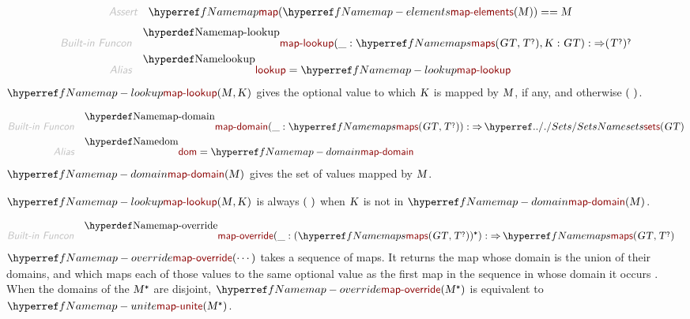 \begin{align*}
  \KEY{Assert} \quad
  & \NAMEREF{map}
      (  \NAMEREF{map-elements}
              (  \VAR{M} ) ) 
    == \VAR{M}
\end{align*}
\begin{align*}
  \KEY{Built-in Funcon} \quad
  & \NAMEDECL{map-lookup}(
                       \_ : \NAMEREF{maps}
                                 (  \VAR{GT}, 
                                        \VAR{T}\QUERY ), \VAR{K} : \VAR{GT}) 
    :  \TO (  \VAR{T}\QUERY )\QUERY 
\\
  \KEY{Alias} \quad
  & \NAMEDECL{lookup} = \NAMEREF{map-lookup}
\end{align*}
$\SHADE{\NAMEREF{map-lookup}
           (  \VAR{M}, 
                  \VAR{K} )}$ gives the optional value to which $\SHADE{\VAR{K}}$ is mapped by $\SHADE{\VAR{M}}$,
  if any, and otherwise $\strut(   \  )\strut$.

\begin{align*}
  \KEY{Built-in Funcon} \quad
  & \NAMEDECL{map-domain}(
                       \_ : \NAMEREF{maps}
                                 (  \VAR{GT}, 
                                        \VAR{T}\QUERY )) 
    :  \TO \NAMEHYPER{../.}{Sets}{sets}
                     (  \VAR{GT} ) 
\\
  \KEY{Alias} \quad
  & \NAMEDECL{dom} = \NAMEREF{map-domain}
\end{align*}
$\SHADE{\NAMEREF{map-domain}
           (  \VAR{M} )}$ gives the set of values mapped by $\SHADE{\VAR{M}}$.

$\SHADE{\NAMEREF{map-lookup}
           (  \VAR{M}, 
                  \VAR{K} )}$ is always $\strut(   \  )\strut$ when $\SHADE{\VAR{K}}$ is not in $\SHADE{\NAMEREF{map-domain}
           (  \VAR{M} )}$.

\begin{align*}
  \KEY{Built-in Funcon} \quad
  & \NAMEDECL{map-override}(
                       \_ : (  \NAMEREF{maps}
                                       (  \VAR{GT}, 
                                              \VAR{T}\QUERY ) )\STAR) 
    :  \TO \NAMEREF{maps}
                     (  \VAR{GT}, 
                            \VAR{T}\QUERY ) 
\end{align*}
$\SHADE{\NAMEREF{map-override}
           (  \cdots )}$ takes a sequence of maps. It returns the map whose
  domain is the union of their domains, and which maps each of those values
  to the same optional value as the first map in the sequence in whose domain 
  it occurs
  . 
  When the domains of the $\SHADE{\VAR{M}\STAR}$ are disjoint, $\SHADE{\NAMEREF{map-override}
           (  \VAR{M}\STAR )}$ is equivalent
  to $\SHADE{\NAMEREF{map-unite}
           (  \VAR{M}\STAR )}$.

